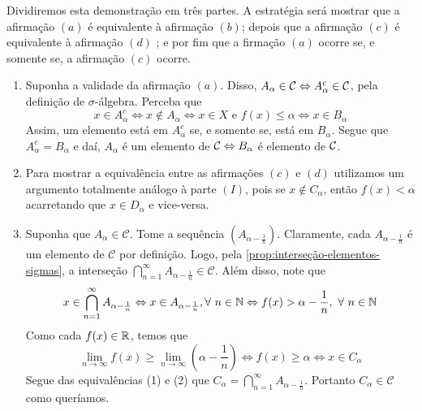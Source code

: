 \begin{prova}
    Dividiremos esta demonstração em três partes. A estratégia será mostrar que a afirmação $(a)$ é equivalente à afirmação $(b)$; depois que a afirmação $(c)$ é equivalente à afirmação $(d)$ ; e por fim que a firmação $(a)$ ocorre se, e somente se, a afirmação $(c)$ ocorre. 
    \begin{enumerate}[label* = (\Roman*)]
        \item Suponha a validade da afirmação $(a)$. 
        Disso, $A_\alpha \in \operatorname{\mathcal{C}} \Leftrightarrow A_\alpha^c \in \operatorname{\mathcal{C}}$, pela definição de $\sigma$-álgebra.
	    Perceba que 
	    $$
	    x \in A_\alpha^c 
	    \Leftrightarrow
	    x \notin A_\alpha
	    \Leftrightarrow  
	    x \in X \textrm{\ e \ } f(x) \leq \alpha
	    \Leftrightarrow 
	    x \in B_\alpha    
		$$ 
		Assim, um elemento está em $A_\alpha^c$ se, e somente se, está em $B_\alpha$. Segue que $A_\alpha^c = B_\alpha$ e daí, $A_\alpha$ é um elemento de $\operatorname{\mathcal{C}} \Leftrightarrow B_\alpha$ é elemento de $\operatorname{\mathcal{C}}$.
		\item Para mostrar a equivalência entre as afirmações $(c)$ e $(d)$ utilizamos um argumento totalmente análogo à parte $(I)$, pois se $x \notin C_\alpha$, então $f(x) < \alpha$ acarretando que $x \in D_\alpha$ e vice-versa.
		\item Suponha que $A_\alpha \in \mathcal{C}$. Tome a sequência $\left(A_{\alpha -\frac{1}{n}}\right)$. Claramente, cada $A_{\alpha - \frac{1}{n}}$ é um elemento de $\mathcal{C}$ por definição.
		Logo, pela \ref{prop:interseção-elementos-sigmas}, a interseção $\displaystyle \bigcap_{n = 1}^\infty A_{\alpha -\frac{1}{n}} \in \mathcal{C}$.
		Além disso, note que 
		\begin{equation}
			x \in \displaystyle \bigcap_{n = 1}^\infty A_{\alpha -\frac{1}{n}}
			\Leftrightarrow
		 	x \in A_{\alpha - \frac{1}{n}}, \forall \ n \in \operatorname{\mathbb{N}}
			\Leftrightarrow
			f(x)> \alpha -\dfrac{1}{n},  \ \forall \ n \in \operatorname{\mathbb{N}}
		\end{equation}
		Como cada $f(x) \in \mathbb{R}$, temos que
		\begin{equation}
			\lim_{n \to \infty} f(x) \geq \lim_{n \to \infty} \left(\alpha - \dfrac{1}{n}\right)
			\Leftrightarrow
			f(x) \geq \alpha
			\Leftrightarrow
			x \in C_\alpha
		\end{equation}
		Segue das equivalências (1) e (2) que $C_\alpha = \displaystyle \bigcap_{n = 1}^\infty A_{\alpha -\frac{1}{n}} $.
		Portanto $C_\alpha \in \mathcal{C}$ como queríamos.
   \end{enumerate}
	

\end{prova}
